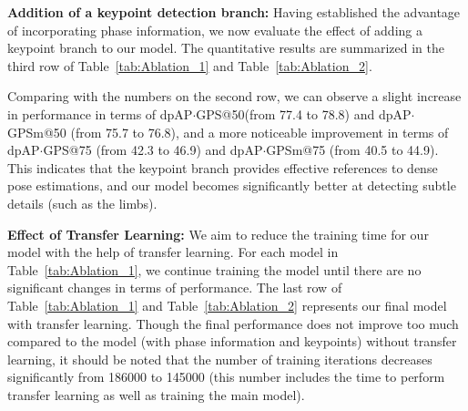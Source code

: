 \documentclass[sigconf, anonymous=false]{acmart}
\begin{document}

{\bf Addition of a keypoint detection branch:} Having established the advantage of incorporating phase information, we now evaluate the effect of adding a keypoint branch to our model. The quantitative results are summarized in the third row of Table~\ref{tab:Ablation_1} and  Table~\ref{tab:Ablation_2}. 

Comparing with the numbers on the second row, we can observe a slight increase in performance in terms of dpAP$\cdot$GPS@50(from 77.4 to 78.8) and dpAP$\cdot$GPSm@50 (from 75.7 to 76.8), and a more noticeable improvement in terms of dpAP$\cdot$GPS@75 (from 42.3 to 46.9) and dpAP$\cdot$GPSm@75 (from 40.5 to 44.9). This indicates that the keypoint branch provides effective references to dense pose estimations, and our model becomes significantly better at detecting subtle details (such as the limbs).  


{\bf Effect of Transfer Learning:} We aim to reduce the training time for our model with the help of transfer learning. For each model in Table~\ref{tab:Ablation_1}, we continue training the model until there are no significant changes in terms of performance. The last row of Table~\ref{tab:Ablation_1} and Table~\ref{tab:Ablation_2} represents our final model with transfer learning. Though the final performance does not improve too much compared to the model (with phase information and keypoints) without transfer learning, it should be noted that the number of training iterations decreases significantly from 186000 to 145000 (this number includes the time to perform transfer learning as well as training the main model). 
\end{document}
